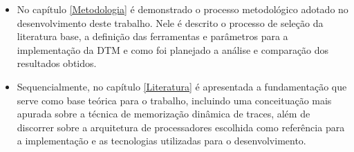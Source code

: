 \begin{itemize}


	\item No capítulo \ref{Metodologia} é demonstrado o processo metodológico adotado no desenvolvimento deste trabalho. Nele é descrito o processo de seleção da literatura base, a definição das ferramentas e parâmetros para a implementação da DTM e como foi planejado a análise e comparação dos resultados obtidos.

	\item Sequencialmente, no capítulo \ref{Literatura} é apresentada a fundamentação que serve como base teórica para o trabalho, incluindo uma conceituação mais apurada sobre a técnica de memorização dinâmica de traces, além de discorrer sobre a arquitetura de processadores escolhida como referência para a implementação e as tecnologias utilizadas para o desenvolvimento.
	

%
%
%

	
\end{itemize}

